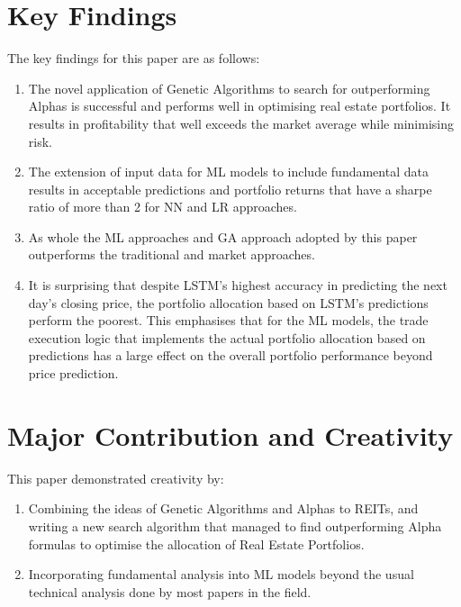 \documentclass[a4paper,12pt]{report}
\numberwithin{equation}{section}
\theoremstyle{definition}
\begin{document}
\section{Key Findings}
The key findings for this paper are as follows:
\begin{enumerate}
  \item {The novel application of Genetic Algorithms to search for outperforming Alphas is successful and performs well in optimising real estate portfolios. It results in profitability that well exceeds the market average while minimising risk.}
  \item {The extension of input data for ML models to include fundamental data results in acceptable predictions and portfolio returns that have a sharpe ratio of more than 2 for NN and LR approaches. }
  \item {As whole the ML approaches and GA approach adopted by this paper outperforms the traditional and market approaches.}
  \item {It is surprising that despite LSTM's highest accuracy in predicting the next day's closing price, the portfolio allocation based on LSTM's predictions perform the poorest. This emphasises that for the ML models, the trade execution logic that implements the actual portfolio allocation based on predictions has a large effect on the overall portfolio performance beyond price prediction.  }
\end{enumerate}

\section{Major Contribution and Creativity}
This paper demonstrated creativity by:
\begin{enumerate}
  \item {Combining the ideas of Genetic Algorithms and Alphas to REITs, and writing a new search algorithm that managed to find outperforming Alpha formulas to optimise the allocation of Real Estate Portfolios.}
  \item {Incorporating fundamental analysis into ML models beyond the usual technical analysis done by most papers in the field.}
\end{enumerate}
\end{document}
